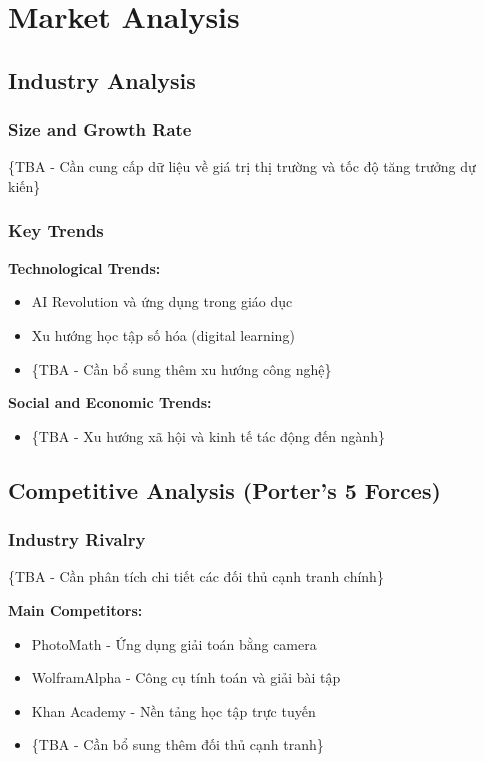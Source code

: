 \section{Market Analysis}

\subsection{Industry Analysis}
\subsubsection{Size and Growth Rate}
\{TBA - Cần cung cấp dữ liệu về giá trị thị trường và tốc độ tăng trưởng dự kiến\}

\subsubsection{Key Trends}
\textbf{Technological Trends:}
\begin{itemize}
    \item AI Revolution và ứng dụng trong giáo dục
    \item Xu hướng học tập số hóa (digital learning)
    \item \{TBA - Cần bổ sung thêm xu hướng công nghệ\}
\end{itemize}

\textbf{Social and Economic Trends:}
\begin{itemize}
    \item \{TBA - Xu hướng xã hội và kinh tế tác động đến ngành\}
\end{itemize}

\subsection{Competitive Analysis (Porter's 5 Forces)}
\subsubsection{Industry Rivalry}
\{TBA - Cần phân tích chi tiết các đối thủ cạnh tranh chính\}

\textbf{Main Competitors:}
\begin{itemize}
    \item PhotoMath - Ứng dụng giải toán bằng camera
    \item WolframAlpha - Công cụ tính toán và giải bài tập
    \item Khan Academy - Nền tảng học tập trực tuyến
    \item \{TBA - Cần bổ sung thêm đối thủ cạnh tranh\}
\end{itemize}

